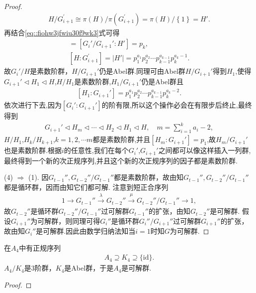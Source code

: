 \documentclass[../../main.tex]{subfiles}%
\begin{document}
\begin{proof}
\begin{align*}
H/G_{i+1}^{\prime}\cong \pi \left( H \right) /\pi \left( G_{i+1}^{\prime} \right) =\pi \left( H \right) /\left\{ 1 \right\} =H'.
\end{align*}
再结合\eqref{eq::fiohw3jfwiu30f9wk3}式可得
\begin{gather*}
[G_i' : H]=[G_i' /G_{i+1}':H' ]= p_k,
\\
[H:G_{i+1}^{\prime}]=\left| H' \right|=p_{1}^{a_1}p_{2}^{a_2}\cdots p_{k-1}^{a_{k-1}}p_{k}^{a_k-1}.
\end{gather*}
故$G_i'/H$是素数阶群，$H/G_{i+1}'$仍是Abel群.同理可由Abel群$H/G_{i+1}'$得到$H_1$,使得$G_{i+1}'\lhd H_1\lhd H$,$H/H_1$是素数阶群,$H_1/G_{i+1}'$仍是Abel群且
\begin{align*}
\left[ H_1:G_{i+1}' \right] =p_{1}^{a_1}p_{2}^{a_2}\cdots p_{k-1}^{a_{k-1}}p_{k}^{a_k-2}.
\end{align*}
依次进行下去,因为$\left[ G_{i}':G_{i+1}' \right]$的阶有限,所以这个操作必会在有限步后终止,最终得到
\begin{align*}
G_{i+1}'\lhd H_m\lhd \cdots \lhd H_2\lhd H_1\lhd H,\quad m=\sum_{i=1}^k{a_i}-2,
\end{align*}
$H/H_1$,$H_k/H_{k+1}$,$k=1,2,\cdots m$都是素数阶群,并且$\left[ H_m:G_{i+1}' \right] =p_1$,故$H_m/G_{i+1}'$也是素数阶群.根据$i$的任意性,我们在每个$G_{i}'$,$G_{i+1}'$之间都可以像这样插入一列群,最终得到一个新的次正规序列,并且这个新的次正规序列的因子都是素数阶群.

(4) $\Rightarrow$ (1). 因$G_{t-1}'',G_{t-2}''/G_{t-1}''$都是素数阶群，故由知$G_{t-1}'',G_{t-2}''/G_{t-1}''$都是循环群，因而由知它们都可解.
注意到短正合序列
\begin{align*}
1\longrightarrow G_{t-1}''\xrightarrow{\lambda}G_{t-2}''\xrightarrow{\mu}G_{t-2}''/G_{t-1}''\longrightarrow 1,
\end{align*}
故$G_{t-2}''$是循环群$G_{t-2}''/G_{t-1}''$过可解群$G_{t-1}''$的扩张，由知$G_{t-2}''$是可解群. 假设$G_{i+1}''$为可解群，则同理可得$G_i''$是循环群$G_{i}''/G_{i+1}''$过可解群$G_{i+1}''$的扩张，故由知$G_i''$是可解群.因此由数学归纳法知当$i = 1$时知$G$为可解群.

\end{proof}

\begin{example}
在$A_4$中有正规序列
\begin{align*}
A_4 \supseteq K_4 \supseteq \{\mathrm{id}\}.
\end{align*}
$A_4/K_4$是3阶群，$K_4$是Abel群，于是$A_4$是可解群.
\end{example}
\begin{proof}



\end{proof}
\end{document}
